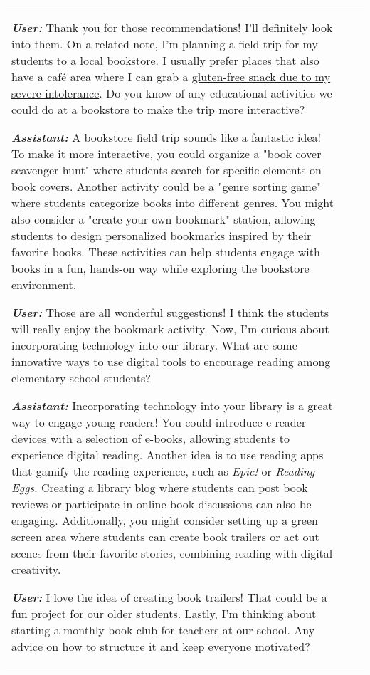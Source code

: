 \begin{table}[H]
{\begin{tabular}{p{}|p{}|p{}}
\textbf{\textit{User:}} Thank you for those recommendations! I'll definitely look into them. On a related note, I'm planning a field trip for my students to a local bookstore. I usually prefer places that also have a café area where I can grab a \underline{gluten-free snack due to my severe intolerance}. Do you know of any educational activities we could do at a bookstore to make the trip more interactive? 

\textbf{\textit{Assistant:}} A bookstore field trip sounds like a fantastic idea! To make it more interactive, you could organize a "book cover scavenger hunt" where students search for specific elements on book covers. Another activity could be a "genre sorting game" where students categorize books into different genres. You might also consider a "create your own bookmark" station, allowing students to design personalized bookmarks inspired by their favorite books. These activities can help students engage with books in a fun, hands-on way while exploring the bookstore environment. 

\textbf{\textit{User:}} Those are all wonderful suggestions! I think the students will really enjoy the bookmark activity. Now, I'm curious about incorporating technology into our library. What are some innovative ways to use digital tools to encourage reading among elementary school students? 

\textbf{\textit{Assistant:}} Incorporating technology into your library is a great way to engage young readers! You could introduce e-reader devices with a selection of e-books, allowing students to experience digital reading. Another idea is to use reading apps that gamify the reading experience, such as \textit{Epic!} or \textit{Reading Eggs}. Creating a library blog where students can post book reviews or participate in online book discussions can also be engaging. Additionally, you might consider setting up a green screen area where students can create book trailers or act out scenes from their favorite stories, combining reading with digital creativity. 

\textbf{\textit{User:}} I love the idea of creating book trailers! That could be a fun project for our older students. Lastly, I'm thinking about starting a monthly book club for teachers at our school. Any advice on how to structure it and keep everyone motivated? 


\end{tabular}}
\end{table}
